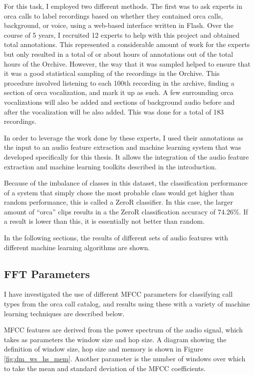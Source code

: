 For this task, I employed two different methods.  The first was to
ask experts in orca calls to label recordings based on whether they
contained orca calls, background, or voice, using a web-based
interface written in Flash.  Over the course of 5 years, I recruited
12 experts to help with this project and obtained \totalAnnotations
total annotations.  This represented a considerable amount of work for
the experts but only resulted in a total of \totalAnnotationsGB or
about \totalAnnotationsTimeHours hours of annotations out of the total
\totalHoursOfOrchiveRecordings hours of the Orchive.  However, the way
that it was sampled helped to ensure that it was a good statistical
sampling of the recordings in the Orchive.  This procedure involved
listening to each 100th recording in the archive, finding a section of
orca vocalization, and mark it up as such.  A few surrounding orca
vocalizations will also be added and sections of background audio
before and after the vocalization will be also added.  This was done
for a total of 183 recordings.

In order to leverage the work done by these experts, I used their
annotations as the input to an audio feature extraction and machine
learning system that was developed specifically for this thesis.  It
allows the integration of the audio feature extraction and machine
learning toolkits described in the introduction.

Because of the imbalance of classes in this dataset, the
classification performance of a system that simply chose the most
probable class would get higher than random performance, this is
called a ZeroR classifier.  In this case, the larger amount of
``orca'' clips results in a the ZeroR classification accuracy of
74.26\%.  If a result is lower than this, it is essentially not better
than random.

In the following sections, the results of different sets of audio
features with different machine learning algorithms are shown.  

%
%
\subsection{FFT Parameters}

I have investigated the use of different MFCC parameters for
classifying call types from the orca call catalog, and results using these
with a variety of machine learning techniques are described below.

MFCC features are derived from the power spectrum of the audio signal,
which takes as parameters the window size and hop size.  A diagram
showing the definition of window size, hop size and memory is shown in
Figure \ref{fig:dm_ws_hs_mem}. Another parameter is the number of
windows over which to take the mean and standard deviation of the MFCC
coefficients.

